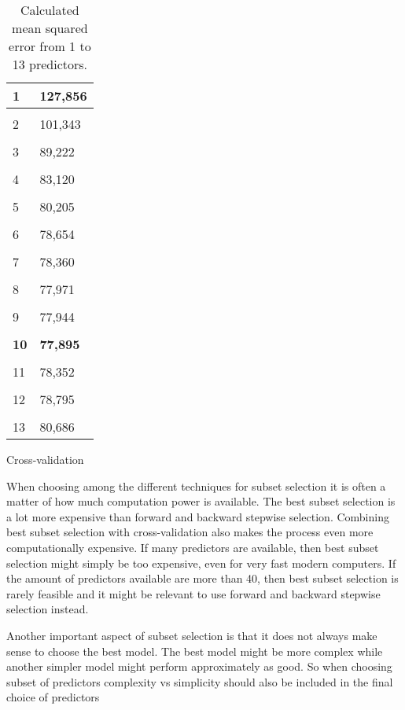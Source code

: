 \begin{table}
\begin{subtable}[t]{2in}
\begin{tabular}{ p{2.5cm} p{1.5cm}  }
		1 & 127,856 \\\hline
		\\
		2 & 101,343 \\\hline
		\\
		3 & 89,222  \\\hline
		\\
		4 & 83,120  \\\hline
		\\
		5 & 80,205  \\\hline
		\\
		6 & 78,654  \\\hline
		\\
		7 & 78,360  \\\hline
		\\
		8 & 77,971  \\\hline
		\\
		9 & 77,944  \\\hline
		\\
		\textbf{10} & \textbf{77,895} \\\hline
		\\
		11 & 78,352  \\\hline
		\\
		12 & 78,795 \\\hline
		\\
		13 & 80,686 \\\hline
	\end{tabular}
		\caption{Cross-validation}\label{table:mse_cross}
	\end{subtable}
	\caption{Calculated mean squared error from 1 to 13 predictors.}\label{table:mse}
\end{table}

When choosing among the different techniques for subset selection it is often a matter of how much computation power is available.  The best subset selection is a lot more expensive than forward and backward stepwise selection. Combining best subset selection with cross-validation also makes the process even more computationally expensive. If many predictors are available, then best subset selection might simply be too expensive, even for very fast modern computers. If the amount of predictors available are more than 40, then best subset selection is rarely feasible and it might be relevant to use forward and backward stepwise selection instead.

Another important aspect of subset selection is that it does not always make sense to choose the best model. The best model might be more complex while another simpler model might perform approximately as good. So when choosing subset of predictors complexity vs simplicity should also be included in the final choice of predictors